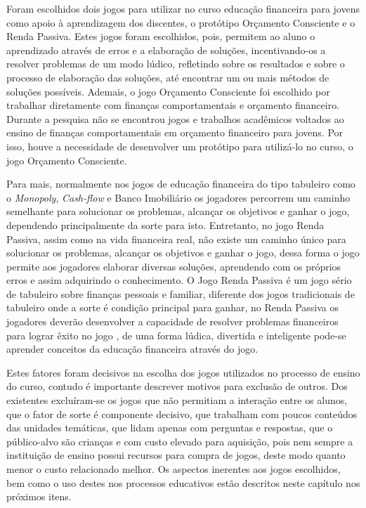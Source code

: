 Foram escolhidos dois jogos para utilizar no curso educação financeira para jovens como apoio à aprendizagem dos discentes, o protótipo Orçamento Consciente e o Renda Passiva. Estes jogos foram escolhidos, pois, permitem ao aluno o aprendizado através de erros e a elaboração de soluções, incentivando-os a resolver problemas de um modo lúdico, refletindo sobre os resultados e sobre o processo de elaboração das soluções, até encontrar um ou mais métodos de soluções possíveis. Ademais, o jogo Orçamento Consciente foi escolhido por trabalhar diretamente com finanças comportamentais e orçamento financeiro. Durante a pesquisa não se encontrou jogos e trabalhos acadêmicos voltados ao ensino de finanças comportamentais em orçamento financeiro para jovens. Por isso, houve a necessidade de desenvolver um protótipo para utilizá-lo no curso, o jogo Orçamento Consciente.

Para mais, normalmente nos jogos de educação financeira do tipo tabuleiro como o \textit{Monopoly}, \textit{Cash-flow} e Banco Imobiliário os jogadores percorrem um caminho semelhante para solucionar os problemas, alcançar os objetivos e ganhar o jogo, dependendo principalmente da sorte para isto. Entretanto, no jogo Renda Passiva, assim como na vida financeira real, não existe um caminho único para solucionar os problemas, alcançar os objetivos e ganhar o jogo, dessa forma o jogo permite aos jogadores elaborar diversas soluções, aprendendo com os próprios erros e assim adquirindo o conhecimento. O Jogo Renda Passiva é um jogo sério de tabuleiro sobre finanças pessoais e familiar, diferente dos jogos tradicionais de tabuleiro onde a sorte é condição principal para ganhar, no Renda Passiva os jogadores deverão desenvolver a capacidade de resolver problemas financeiros para lograr êxito no jogo \cite{frechiani2019a}, de uma forma lúdica, divertida e inteligente pode-se aprender conceitos da educação financeira através do jogo.

Estes fatores foram decisivos na escolha dos jogos utilizados no processo de ensino do curso, contudo é importante descrever motivos para exclusão de outros. Dos existentes excluíram-se os jogos que não permitiam a interação entre os alunos, que o fator de sorte é componente decisivo, que trabalham com poucos conteúdos das unidades temáticas, que lidam apenas com perguntas e respostas, que o público-alvo são crianças e com custo elevado para aquisição, pois nem sempre a instituição de ensino possui recursos para compra de jogos, deste modo quanto menor o custo relacionado melhor. Os aspectos inerentes aos jogos escolhidos, bem como o uso destes nos processos educativos estão descritos neste capítulo nos próximos itens.

